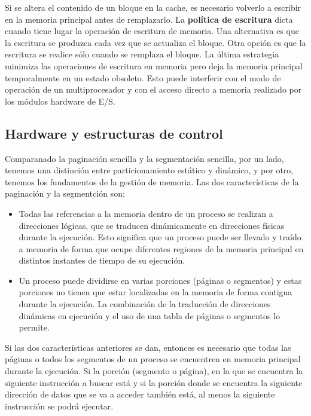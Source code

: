 \documentclass{article}
\begin{document}
			Si se altera el contenido de un bloque en la cache, es necesario volverlo a escribir en la memoria principal antes de remplazarlo. La \textbf{política de escritura} dicta cuando tiene lugar la operación de escritura de memoria. Una alternativa es que la escritura se produzca cada vez que se actualiza el bloque. Otra opción es que la escritura se realice sólo cuando se remplaza el bloque. La última estrategia minimiza las operaciones de escritura en memoria pero deja la memoria principal temporalmente en un estado obsoleto. Esto puede interferir con el modo de operación de un multiprocesador y con el acceso directo a memoria realizado por los módulos hardware de E/S.
			
	\subsection{Hardware y estructuras de control}
		Comparanado la paginación sencilla y la segmentación sencilla, por un lado, tenemos una distinción entre particionamiento estático y dinámico, y por otro, tenemos los fundamentos de la gestión de memoria. Las dos características de la paginación y la segmentción son:
		
		\begin{itemize}
		\item  Todas las referencias a la memoria dentro de un proceso se realizan a direcciones lógicas, que se traducen dinámicamente en direcciones físicas durante la ejecución. Esto significa que un proceso puede ser llevado y traído a memoria de forma que ocupe diferentes regiones de la memoria principal en distintos instantes de tiempo de su ejecución.
		
		\item Un proceso puede dividirse en varias porciones (páginas o segmentos) y estas porciones no tienen que estar localizadas en la memoria de forma contigua durante la ejecución. La combinación de la traducción de direcciones dinámicas en ejecución y el uso de una tabla de páginas o segmentos lo permite.
		\end{itemize}
		
		Si las dos características anteriores se dan, entonces es necesario que todas las páginas o todos los segmentos de un proceso se encuentren en memoria principal durante la ejecución. Si la porción (segmento o página), en la que se encuentra la siguiente instrucción a buscar está y si la porción donde se encuentra la siguiente dirección de datos que se va a acceder también está, al menos la siguiente instrucción se podrá ejecutar. \\
		
\end{document}
